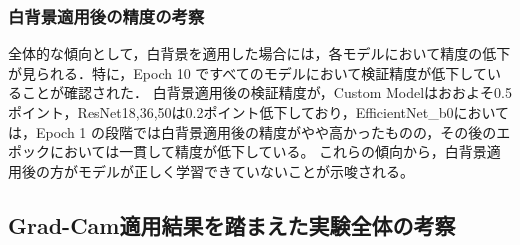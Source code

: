 \documentclass[a4paper,11pt,titlepage]{jsarticle}
\begin{document}
\subsubsection{白背景適用後の精度の考察}

全体的な傾向として，白背景を適用した場合には，各モデルにおいて精度の低下が見られる．特に，Epoch 10 ですべてのモデルにおいて検証精度が低下していることが確認された．
白背景適用後の検証精度が，Custom Modelはおおよそ0.5ポイント，ResNet18,36,50は0.2ポイント低下しており，EfficientNet\_b0においては，Epoch 1 の段階では白背景適用後の精度がやや高かったものの，その後のエポックにおいては一貫して精度が低下している。
これらの傾向から，白背景適用後の方がモデルが正しく学習できていないことが示唆される。



\subsection{Grad-Cam適用結果を踏まえた実験全体の考察}
\end{document}

